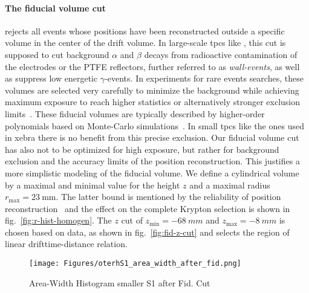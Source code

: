 \paragraph{The fiducial volume cut} rejects all events whose positions have been reconstructed outside a specific volume in the center of the drift volume.
In large-scale \glspl{tpc} like \nton, this cut is supposed to cut background $\alpha$ and $\beta$ decays from radioactive contamination of the electrodes or the PTFE reflectors, further referred to as \emph{wall-events}, as well as suppress low energetic $ \gamma $-events.
In experiments for rare events searches, these volumes are selected very carefully to minimize the background while achieving maximum exposure to reach higher statistics or alternatively stronger exclusion limits~\cite{?}.  %
These fiducial volumes are typically described by higher-order polynomials based on Monte-Carlo simulations~\cite{?}. %
In small \glspl{tpc} like the ones used in \gls{xebra} there is no benefit from this precise exclusion.
Our fiducial volume cut has also not to be optimized for high exposure, but rather for background exclusion and the accuracy limits of the position reconstruction.
This justifies a more simplistic modeling of the fiducial volume.
We define a cylindrical volume by a maximal and minimal value for the height $z$ and a maximal radius $r_\mathrm{max} = \SI{23}{\milli\m}$.
The latter bound is mentioned by the reliability of position reconstruction~\cite{ABism} and the effect on the complete Krypton selection is shown in fig.~\ref{fig:r-hist-homogen}.
The $z$ cut of $ z_\mathrm{min} = \SI{-68}{mm} $ and $ z_\mathrm{max} = \SI{-8}{mm} $ is chosen based on data, as shown in fig.~\ref{fig:fid-z-cut} and selects the region of linear drifttime-distance relation.


\begin{figure}[H]
\centering
\texttt{[image: Figures/oterhS1\_area\_width\_after\_fid.png]}  %
\caption[Area-Width Histogram smaller S1 after Fid. Cut]{
    Area-Width Histogram smaller S1 after Fid. Cut
    }
\label{fig:other_s1_area_width}
\end{figure}


